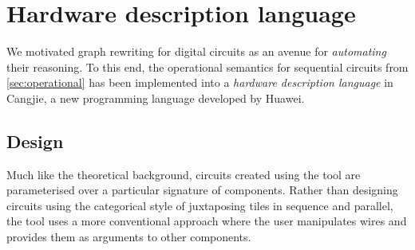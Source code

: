 \section{Hardware description language}

We motivated graph rewriting for digital circuits as an avenue for
\emph{automating} their reasoning.
To this end, the operational semantics for sequential circuits from
\cref{sec:operational} has been implemented into a
\emph{hardware description language} in Cangjie, a new programming
language developed by Huawei.

\subsection{Design}

Much like the theoretical background, circuits created using the tool are
parameterised over a particular signature of components.
Rather than designing circuits using the categorical style of juxtaposing
tiles in sequence and parallel, the tool uses a more conventional approach
where the user manipulates wires and provides them as arguments to other
components.

